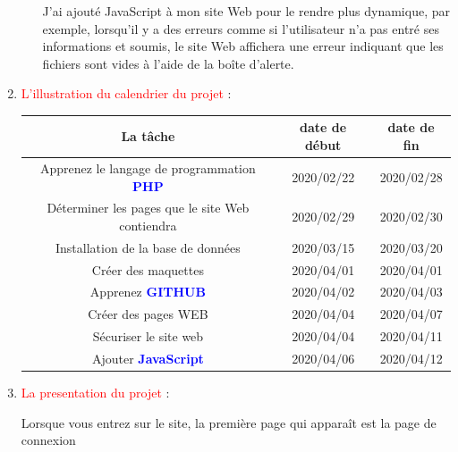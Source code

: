 \documentclass{article}
\begin{document}
\begin{enumerate}
\begin{enumerate}
         \vspace{0.4cm}
                \setlength{\parindent}{1cm} J'ai ajouté JavaScript à mon site Web pour le rendre plus dynamique, par exemple, lorsqu'il y a des erreurs comme si l'utilisateur n'a pas entré ses informations et soumis, le site Web affichera une erreur indiquant que les fichiers sont vides à l'aide de la boîte d'alerte.
         
         
   
    \end{enumerate}
   \item \textcolor{red}{\huge L'illustration du calendrier du projet} :  
   \vspace{1.2cm}
   
         \hspace*{-0.83in}
        \begin{tabular}{|c | c | c|}
        \hline
          La tâche & date de début & date de fin\\ 
        \hline
        Apprenez le langage de programmation \textcolor{blue}{\textbf{PHP}} & 2020/02/22 & 2020/02/28 \\ 
        \hline
        Déterminer les pages que le site Web contiendra & 2020/02/29 & 2020/02/30 \\ 
        \hline
        Installation de la base de données & 2020/03/15 & 2020/03/20\\
        \hline
        Créer des maquettes & 2020/04/01  & 2020/04/01\\
        \hline
        Apprenez \textcolor{blue}{\textbf{GITHUB}} & 2020/04/02  & 2020/04/03\\
        \hline
        Créer des pages WEB & 2020/04/04  & 2020/04/07\\
        \hline
        Sécuriser le site web & 2020/04/04  & 2020/04/11\\
        \hline
        Ajouter \textcolor{blue}{\textbf{JavaScript}} & 2020/04/06  & 2020/04/12
        \end{tabular}
        
   
   \item \textcolor{red}{\huge La presentation du projet} :  
   \vspace{0.7cm}
   

	Lorsque vous entrez sur le site, la première page qui apparaît est la page de connexion
	

\end{enumerate}
\end{document}
